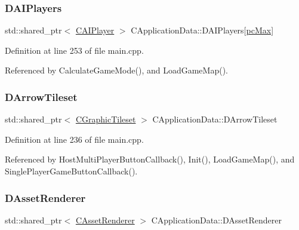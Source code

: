 \subsubsection{\texorpdfstring{D\+A\+I\+Players}{DAIPlayers}}
{\footnotesize\ttfamily std\+::shared\+\_\+ptr$<$ \hyperlink{classCAIPlayer}{C\+A\+I\+Player} $>$ C\+Application\+Data\+::\+D\+A\+I\+Players\mbox{[}\hyperlink{GameDataTypes_8h_aafb0ca75933357ff28a6d7efbdd7602fa594a5c8dd3987f24e8a0f23f1a72cd34}{pc\+Max}\mbox{]}\hspace{0.3cm}{\ttfamily [protected]}}



Definition at line 253 of file main.\+cpp.



Referenced by Calculate\+Game\+Mode(), and Load\+Game\+Map().

\hypertarget{classCApplicationData_a5c617fcea02a399ecffee313eead2159}{}\label{classCApplicationData_a5c617fcea02a399ecffee313eead2159} 
\subsubsection{\texorpdfstring{D\+Arrow\+Tileset}{DArrowTileset}}
{\footnotesize\ttfamily std\+::shared\+\_\+ptr$<$ \hyperlink{classCGraphicTileset}{C\+Graphic\+Tileset} $>$ C\+Application\+Data\+::\+D\+Arrow\+Tileset\hspace{0.3cm}{\ttfamily [protected]}}



Definition at line 236 of file main.\+cpp.



Referenced by Host\+Multi\+Player\+Button\+Callback(), Init(), Load\+Game\+Map(), and Single\+Player\+Game\+Button\+Callback().

\hypertarget{classCApplicationData_a5b42401441ae3a70fb4bd26f5dfdba01}{}\label{classCApplicationData_a5b42401441ae3a70fb4bd26f5dfdba01} 
\subsubsection{\texorpdfstring{D\+Asset\+Renderer}{DAssetRenderer}}
{\footnotesize\ttfamily std\+::shared\+\_\+ptr$<$ \hyperlink{classCAssetRenderer}{C\+Asset\+Renderer} $>$ C\+Application\+Data\+::\+D\+Asset\+Renderer\hspace{0.3cm}{\ttfamily [protected]}}



